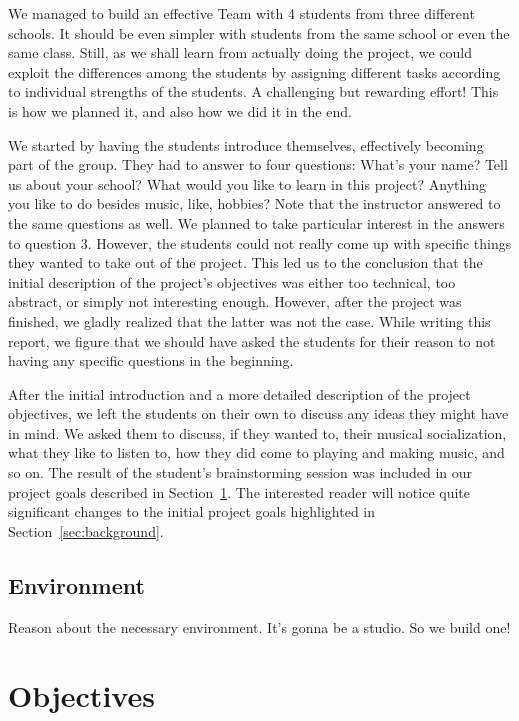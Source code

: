 \documentclass[onecolumn,nocopyrightspace,preprint]{sigplanconf}
\begin{document}
We managed to build an effective Team with 4 students from three different
schools.  It should be even simpler with students from the same school or even
the same class. Still, as we shall learn from actually doing the project, we
could exploit the differences among the students by assigning different tasks
according to individual strengths of the students. A challenging but rewarding
effort! This is how we planned it, and also how we did it in the end.

We started by having the students introduce themselves, effectively becoming
part of the group. They had to answer to four questions: What's your name?
Tell us about your school?  What would you like to learn in this project?
Anything you like to do besides music, like, hobbies? Note that the instructor
answered to the same questions as well.  We planned to take particular
interest in the answers to question 3. However, the students could not really
come up with specific things they wanted to take out of the project. This led
us to the conclusion that the initial description of the project's objectives
was either too technical, too abstract, or simply not interesting enough.
However, after the project was finished, we gladly realized that the latter
was not the case. While writing this report, we figure that we should have
asked the students for their reason to not having any specific questions in
the beginning.

After the initial introduction and a more detailed description of the project
objectives, we left the students on their own to discuss any ideas they might
have in mind. We asked them to discuss, if they wanted to, their musical
socialization, what they like to listen to, how they did come to playing and
making music, and so on. The result of the student's brainstorming session
was included in our project goals described in Section~\ref{sec:objectives}.
The interested reader will notice quite significant changes to the initial
project goals highlighted in Section~\ref{sec:background}.


\subsection{Environment}

Reason about the necessary environment. It's gonna be a studio. So we build one!

\section{Objectives}\label{sec:objectives}
\end{document}
